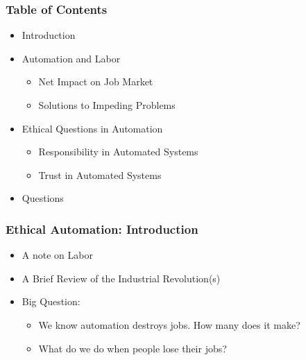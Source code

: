 



\begin{frame}
  \frametitle{ Table of Contents}
  \begin{itemize}
  \item Introduction
  \item Automation and Labor
    \begin{itemize}
    \item Net Impact on Job Market
    \item Solutions to Impeding Problems
    \end{itemize}
  \item Ethical Questions in Automation
    \begin{itemize}
    \item Responsibility in Automated Systems
    \item Trust in Automated Systems
    \end{itemize}
  \item Questions
  \end{itemize}
\end{frame}


\begin{frame}
  \frametitle{ Ethical Automation: Introduction}
  \begin{itemize}
  \item A note on Labor
  \item A Brief Review of the Industrial Revolution(s)
  \item Big Question:
    \begin{itemize}
    \item We know automation destroys jobs.  How many does it make?
    \item What do we do when people lose their jobs?
    \end{itemize}
  \end{itemize}
\end{frame}


